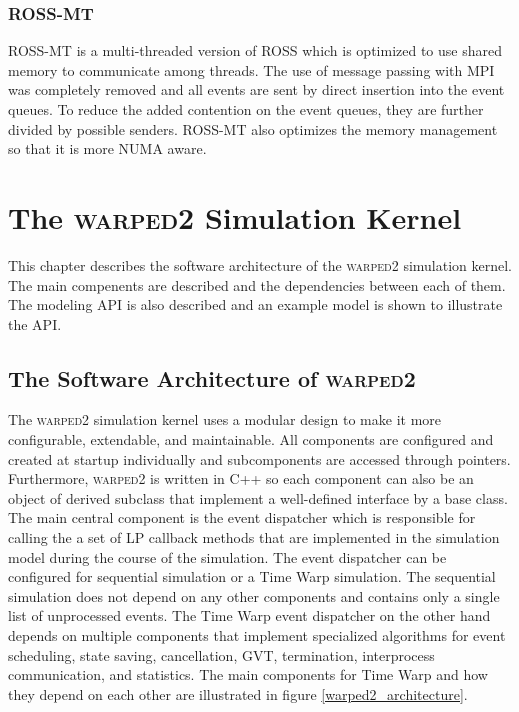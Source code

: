 \documentclass[11pt]{book}
\begin{document}
\subsection{ROSS-MT}

ROSS-MT\cite{jagtap-12} is a multi-threaded version of ROSS which is optimized to use shared
memory to communicate among threads.  The use of message passing with MPI was completely
removed and all events are sent by direct insertion into the event queues.  To reduce the
added contention on the event queues, they are further divided by possible senders.  ROSS-MT
also optimizes the memory management so that it is more NUMA aware.



\chapter[\textsc{warped2}]{The \textsc{warped2} Simulation Kernel}\label{warped2_overview}

This chapter describes the software architecture of the \textsc{warped2} simulation kernel.
The main compenents are described and the dependencies between each of them.  The modeling API
is also described and an example model is shown to illustrate the API.

\section{The Software Architecture of \textsc{warped2}}

The \textsc{warped2} simulation kernel uses a modular design to make it more configurable,
extendable, and maintainable.  All components are configured and created at startup individually
and subcomponents are accessed through pointers.  Furthermore, \textsc{warped2} is written in
C++ so each component can also be an object of derived subclass that implement a well-defined
interface by a base class.  The main central component is the event dispatcher which is responsible
for calling the a set of LP callback methods that are implemented in the simulation model during
the course of the simulation.  The event dispatcher can be configured for sequential simulation
or a Time Warp simulation.  The sequential simulation does not depend on any other components and
contains only a single list of unprocessed events.  The Time Warp event dispatcher on the other
hand depends on multiple components that implement specialized algorithms for event scheduling,
state saving, cancellation, GVT, termination, interprocess communication, and statistics.  The
main components for Time Warp and how they depend on each other are illustrated in figure
\ref{warped2_architecture}.
\end{document}
